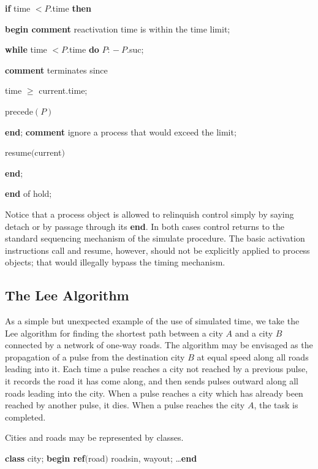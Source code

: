 \quad \quad \quad \quad \textbf{if} time $< P$.time \textbf{then}

\quad \quad \quad \quad \quad \textbf{begin comment} reactivation time is within the time limit;

\quad \quad \quad \quad \quad \quad \textbf{while} time $< P$.time \textbf{do} $P$: $-\ P$.suc;

\quad \quad \quad \quad \quad \quad \textbf{comment} terminates since

\quad \quad \quad \quad \quad \quad \quad time $\geqslant$ current.time;

\quad \quad \quad \quad \quad \quad precede$(P)$

\quad \quad \quad \quad \quad \textbf{end}; \textbf{comment} ignore a process that would exceed the limit;

\quad \quad \quad \quad resume$($current$)$

\quad \quad \textbf{end};

\quad \textbf{end} of hold;

\noindent
Notice that a process object is allowed to relinquish control simply by saying detach or by passage through its \textbf{end}. In both cases control returns to the standard sequencing mechanism of the simulate procedure. The basic activation instructions call and resume, however, should not be explicitly applied to process objects; that would illegally bypass the timing mechanism.

\subsection{The Lee Algorithm}

As a simple but unexpected example of the use of simulated time, we take the Lee algorithm for finding the shortest path between a city $A$ and a city $B$ connected by a network of one-way roads. The algorithm may be envisaged as the propagation of a pulse from the destination city $B$ at equal speed along all roads leading into it. Each time a pulse reaches a city not reached by a previous pulse, it records the road it has come along, and then sends pulses outward along all roads leading into the city. When a pulse reaches a city which has already been reached by another pulse, it dies. When a pulse reaches the city $A$, the task is completed.

Cities and roads may be represented by classes.

\quad \textbf{class} city; \textbf{begin ref}$($road$)$ roadsin, wayout; \dots \textbf{end}


